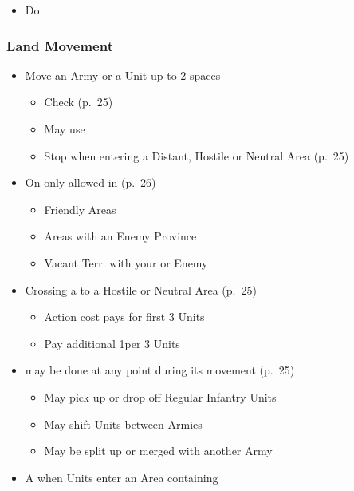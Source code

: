 \documentclass[10pt]{article}
\begin{document}
\begin{itemize}
	\item Do   
\end{itemize}

\subsubsection*{Land Movement}
\begin{itemize}
	\item Move an Army or a Unit up to 2 spaces
	\begin{itemize}
		\item {}Check  (p.~25)
		\item May use 
		\item Stop when entering a Distant, Hostile or Neutral Area (p.~25)
	\end{itemize}
	\item On  only allowed in (p.~26)
	\begin{itemize}
		\item Friendly Areas
		\item Areas with an Enemy Province
		\item Vacant Terr. with your or Enemy \claim
	\end{itemize}
	\item Crossing a  to a Hostile or Neutral Area (p.~25)
	\begin{itemize}
		\item Action cost pays for first 3 Units
		\item Pay additional 1\milpower per 3 Units
	\end{itemize}
	\item {} may be done at any point during its movement (p.~25)
	\begin{itemize}
		\item May pick up or drop off Regular Infantry Units
		\item May shift Units between Armies
		\item May be split up or merged with another Army
	\end{itemize}
	\item A  when Units enter an Area containing
	\begin{itemize}

\end{itemize}
\end{itemize}
\end{document}
